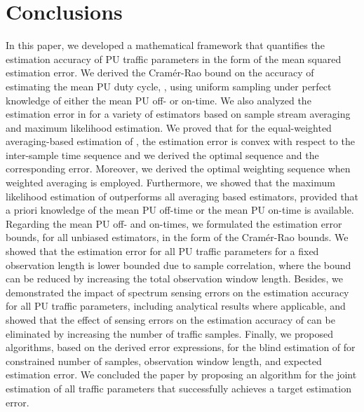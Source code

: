 \documentclass[11pt,draftclsnofoot,journal,onecolumn]{IEEEtran}
\newcounter{MYtempeqncnt}
\begin{document}
\begin{figure*}[!t]
\normalsize
\setcounter{MYtempeqncnt}{\value{equation}}
\setcounter{equation}{40}

\setcounter{equation}{\value{MYtempeqncnt}}
\hrulefill
\vspace*{4pt}
\end{figure*}

\section{Conclusions}
\label{sec:conclusions}

In this paper, we developed a mathematical framework that quantifies the estimation accuracy of PU traffic parameters in the form of the mean squared estimation error. We derived the Cram\'{e}r-Rao bound on the accuracy of estimating the mean PU duty cycle, , using uniform sampling under perfect knowledge of either the mean PU off- or on-time. We also analyzed the estimation error in  for a variety of estimators based on sample stream averaging and maximum likelihood estimation. We proved that for the equal-weighted averaging-based estimation of , the estimation error is convex with respect to the inter-sample time sequence and we derived the optimal sequence and the corresponding error. Moreover, we derived the optimal weighting sequence when weighted averaging is employed. Furthermore, we showed that the maximum likelihood estimation of  outperforms all averaging based estimators, provided that a priori knowledge of the mean PU off-time or the mean PU on-time is available. Regarding the mean PU off- and on-times, we formulated the estimation error bounds, for all unbiased estimators, in the form of the Cram\'{e}r-Rao bounds. We showed that the estimation error for all PU traffic parameters for a fixed observation length is lower bounded due to sample correlation, where the bound can be reduced by increasing the total observation window length. Besides, we demonstrated the impact of spectrum sensing errors on the estimation accuracy for all PU traffic parameters, including analytical results where applicable, and showed that the effect of sensing errors on the estimation accuracy of  can be eliminated by increasing the number of traffic samples. Finally, we proposed algorithms, based on the derived error expressions, for the blind estimation of  for constrained number of samples, observation window length, and expected estimation error. We concluded the paper by proposing an algorithm for the joint estimation of all traffic parameters that successfully achieves a target estimation error.
\end{document}
